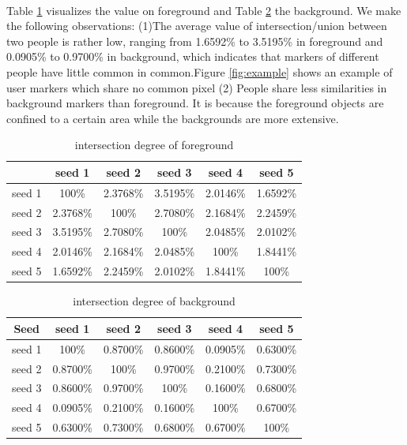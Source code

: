 \documentclass[runningheads,a4paper]{llncs}
\begin{document}
\paragraph{}Table \ref{ta:intersection degree f} visualizes the value on foreground and Table \ref{ta:intersection degree b} the background. We make the following observations: (1)The average value of intersection/union between two people is rather low, ranging from 1.6592\% to 3.5195\% in foreground and 0.0905\% to 0.9700\% in background, which indicates that markers of different people have little common in common.Figure \ref{fig:example} shows an example of user markers which share no common pixel (2) People share less similarities in background markers than foreground. It is because the foreground objects are confined to a certain area while the backgrounds are more extensive. 


\begin{table}
\centering
\begin{tabular}{|c|c|c|c|c|c|}
\hline
 & seed 1 & seed 2 & seed 3 & seed 4& seed 5 \\
\hline
seed 1 & 100\% & 2.3768\% & 3.5195\% & 2.0146\%& 1.6592\% \\
\hline
seed 2 & 2.3768\% & 100\% & 2.7080\% & 2.1684\%& 2.2459\% \\
\hline
seed 3 & 3.5195\% & 2.7080\% & 100\% & 2.0485\%& 2.0102\%\\
\hline
seed 4 & 2.0146\% & 2.1684\% & 2.0485\% & 100\%& 1.8441\% \\
\hline
seed 5 & 1.6592\% & 2.2459\% & 2.0102\% & 1.8441\%& 100\% \\
\hline
\end{tabular}
\caption{intersection degree of foreground}
\label{ta:intersection degree f}
\end{table} 

\begin{table}
\centering
\begin{tabular}{|c|c|c|c|c|c|}
\hline
 Seed & seed 1 & seed 2 & seed 3 & seed 4& seed 5 \\
\hline
seed 1 & 100\% & 0.8700\% & 0.8600\% & 0.0905\%& 0.6300\% \\
\hline
seed 2 & 0.8700\% & 100\% & 0.9700\% & 0.2100\%& 0.7300\% \\
\hline
seed 3 & 0.8600\% & 0.9700\% & 100\% & 0.1600\%& 0.6800\%\\
\hline
seed 4 & 0.0905\% & 0.2100\% & 0.1600\% & 100\%& 0.6700\% \\
\hline
seed 5 & 0.6300\% & 0.7300\% & 0.6800\% & 0.6700\% & 100\% \\
\hline
\end{tabular}
\caption{intersection degree of background}
\label{ta:intersection degree b}
\end{table} 
\end{document}
